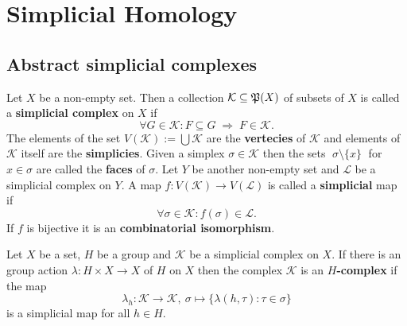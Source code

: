 \section{Simplicial Homology}

\subsection{Abstract simplicial complexes}

\begin{defin}
    Let $X$ be a non-empty set. Then a collection $\mathcal{K} \subseteq \mathfrak{P}(X)$ of subsets of $X$ is called a 
    \textbf{simplicial complex} on $X$ if
    \begin{equation*}
        \forall G\in\mathcal{K} \colon F \subseteq G \; \Rightarrow \; F \in \mathcal{K}.
    \end{equation*}
    The elements of the set $V(\mathcal{K}) := \bigcup \mathcal{K}$ are the \textbf{vertecies} of $\mathcal{K}$ and
    elements of $\mathcal{K}$ itself are the \textbf{simplicies}. Given a simplex $\sigma \in \mathcal{K}$ then the sets
    $\; \sigma \setminus \{x\} \;$ for $x \in \sigma$ are called the \textbf{faces} of $\sigma$.
    Let $Y$ be another non-empty set and $\mathcal{L}$ be a simplicial complex on $Y$. A map $f: V(\mathcal{K}) \to V(\mathcal{L})$ is called 
    a \textbf{simplicial} map if
    \begin{equation*}
        \forall \sigma \in \mathcal{K}\colon f(\sigma) \in \mathcal{L}.
    \end{equation*}
    If $f$ is bijective it is an \textbf{combinatorial isomorphism}.
\end{defin}


\begin{defin}
    Let $X$ be a set, $H$ be a group and $\mathcal{K}$ be a simplicial complex on $X$. If there is an 
    group action $\lambda \colon H \times X \to X$ of $H$ on $X$ then
    the complex $\mathcal{K}$ is an \textbf{$H$-complex} if the map
    \begin{equation*}
        \lambda_h \colon \mathcal{K} \to \mathcal{K}, \: \sigma \mapsto \{ \lambda(h, \tau)\colon \tau \in \sigma \}
    \end{equation*}
    is a simplicial map for all $h \in H$.
\end{defin}

